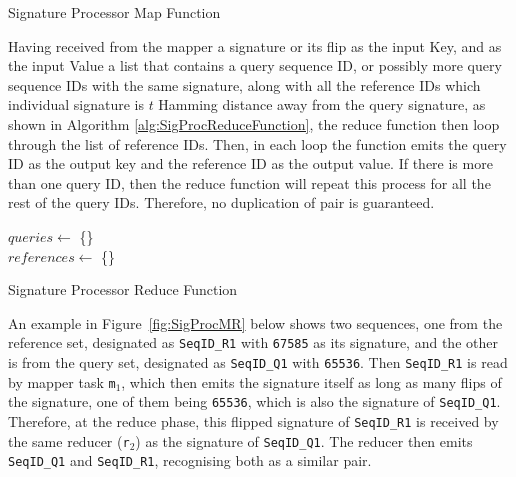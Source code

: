 \documentclass[titlepage]{csetr}
\begin{document}
\begin{algorithm} [t]
\SetAlgoLined
 	
\caption{Signature Processor Map Function}
\label{alg:SigProcMapFunction}
\end{algorithm}

Having received from the mapper a signature or its flip as the input Key, and as the input Value a list that contains a query sequence ID, or possibly more query sequence IDs with the same signature, along with all the reference IDs which individual signature is $t$ Hamming distance away from the query signature, as shown in Algorithm \ref{alg:SigProcReduceFunction}, the reduce function then loop through the list of reference IDs. Then, in each loop the function emits the query ID as the output key and the reference ID as the output value. If there is more than one query ID, then the reduce function will repeat this process for all the rest of the query IDs. Therefore, no duplication of pair is guaranteed.

\begin{algorithm} [t]
\SetAlgoLined
	$queries \gets$ \{\}\\
	$references \gets$ \{\}\\
 \caption{Signature Processor Reduce Function}
\label{alg:SigProcReduceFunction}
\end{algorithm}

An example in Figure~\ref{fig:SigProcMR} below shows two sequences, one from the reference set, designated as \texttt{SeqID\_R1} with \texttt{67585} as its signature, and the other is from the query set, designated as \texttt{SeqID\_Q1} with \texttt{65536}. Then \texttt{SeqID\_R1} is read by mapper task \texttt{m$_{1}$}, which then emits the signature itself as long as many flips of the signature, one of them being \texttt{65536}, which is also the signature of \texttt{SeqID\_Q1}. Therefore, at the reduce phase, this flipped signature of \texttt{SeqID\_R1} is received by the same reducer (\texttt{r$_{2}$}) as the signature of \texttt{SeqID\_Q1}. The reducer then emits \texttt{SeqID\_Q1} and \texttt{SeqID\_R1}, recognising both as a similar pair.
\end{document}
